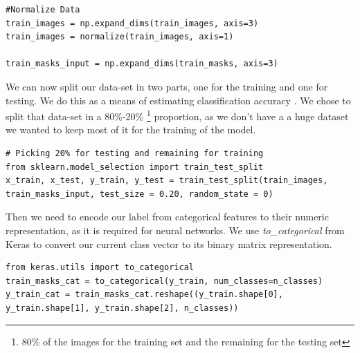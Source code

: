 \documentclass[12pt,a4paper]{scrartcl}
\begin{document}
\begin{lstlisting}[caption={Normalize the data, the code can be found in the \emph{train.py} file}]
#Normalize Data
train_images = np.expand_dims(train_images, axis=3)
train_images = normalize(train_images, axis=1)

train_masks_input = np.expand_dims(train_masks, axis=3)
\end{lstlisting}

We can now split our data-set in two parts, one for the training and one for testing. We do this as a means of estimating classification accuracy \cite{DatasetSplitting:2011}. We chose to split that data-set in a 80\%-20\% \footnote{80\% of the images for the training set and the remaining for the testing set} proportion, as we don't have a a huge dataset we wanted to keep most of it for the training of the model.
\begin{lstlisting}[caption={Dataset split for testing and training from the \emph{train.py} file}, label={lst:data-split}]
# Picking 20% for testing and remaining for training
from sklearn.model_selection import train_test_split
x_train, x_test, y_train, y_test = train_test_split(train_images, train_masks_input, test_size = 0.20, random_state = 0) 
\end{lstlisting}

Then we need to encode our label from categorical features to their numeric representation, as it is required for neural networks. We use \emph{to\_categorical} from Keras \cite{chollet2015keras} to convert our current class vector to its binary matrix representation.

\begin{lstlisting}[caption={Data conversion into categorical, code belongs in the \emph{train.py} file}, label={lst:data-categorical}]
from keras.utils import to_categorical
train_masks_cat = to_categorical(y_train, num_classes=n_classes)
y_train_cat = train_masks_cat.reshape((y_train.shape[0], y_train.shape[1], y_train.shape[2], n_classes))
\end{lstlisting}
\end{document}

